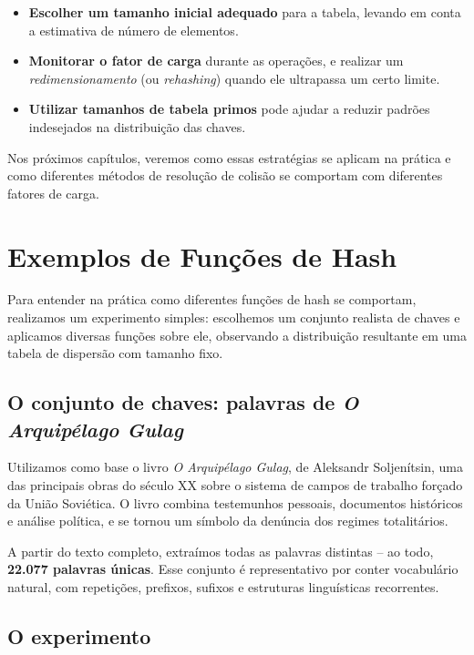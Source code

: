 \begin{itemize}
  \item \textbf{Escolher um tamanho inicial adequado} para a tabela, levando em conta a estimativa de número de elementos.
  
  \item \textbf{Monitorar o fator de carga} durante as operações, e realizar um \emph{redimensionamento} (ou \emph{rehashing}) quando ele ultrapassa um certo limite.
  
  \item \textbf{Utilizar tamanhos de tabela primos} pode ajudar a reduzir padrões indesejados na distribuição das chaves.
\end{itemize}

Nos próximos capítulos, veremos como essas estratégias se aplicam na prática e como diferentes métodos de resolução de colisão se comportam com diferentes fatores de carga.

\section{Exemplos de Funções de Hash}

Para entender na prática como diferentes funções de hash se comportam, realizamos um experimento simples: escolhemos um conjunto realista de chaves e aplicamos diversas funções sobre ele, observando a distribuição resultante em uma tabela de dispersão com tamanho fixo.

\subsection*{O conjunto de chaves: palavras de \emph{O Arquipélago Gulag}}

Utilizamos como base o livro \emph{O Arquipélago Gulag}, de Aleksandr Soljenítsin, uma das principais obras do século XX sobre o sistema de campos de trabalho forçado da União Soviética. 
O livro combina testemunhos pessoais, documentos históricos e análise política, e se tornou um símbolo da denúncia dos regimes totalitários.

A partir do texto completo, extraímos todas as palavras distintas -- ao todo, \textbf{22.077 palavras únicas}. 
Esse conjunto é representativo por conter vocabulário natural, com repetições, prefixos, sufixos e estruturas linguísticas recorrentes.

\subsection*{O experimento}

